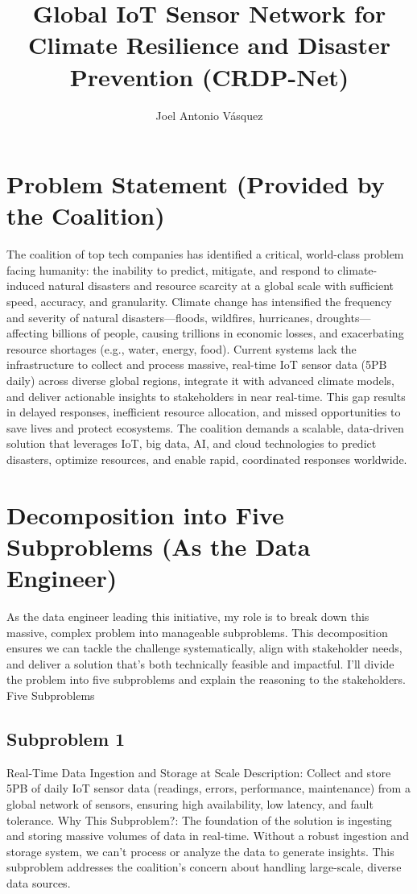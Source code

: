 \documentclass[10pt]{article}
\author{Joel Antonio Vásquez}
\title{Global IoT Sensor Network for Climate Resilience and Disaster Prevention (CRDP-Net)}
\begin{document}
\maketitle

\section{Problem Statement (Provided by the Coalition)}
The coalition of top tech companies has identified a critical, world-class problem facing humanity: the inability to predict, mitigate, and respond to climate-induced natural disasters and resource scarcity at a global scale with sufficient speed, accuracy, and granularity. Climate change has intensified the frequency and severity of natural disasters—floods, wildfires, hurricanes, droughts—affecting billions of people, causing trillions in economic losses, and exacerbating resource shortages (e.g., water, energy, food). Current systems lack the infrastructure to collect and process massive, real-time IoT sensor data (5PB daily) across diverse global regions, integrate it with advanced climate models, and deliver actionable insights to stakeholders in near real-time. This gap results in delayed responses, inefficient resource allocation, and missed opportunities to save lives and protect ecosystems. The coalition demands a scalable, data-driven solution that leverages IoT, big data, AI, and cloud technologies to predict disasters, optimize resources, and enable rapid, coordinated responses worldwide.

\section{Decomposition into Five Subproblems (As the Data Engineer)}
As the data engineer leading this initiative, my role is to break down this massive, complex problem into manageable subproblems. This decomposition ensures we can tackle the challenge systematically, align with stakeholder needs, and deliver a solution that’s both technically feasible and impactful. I’ll divide the problem into five subproblems and explain the reasoning to the stakeholders. \\
Five Subproblems \\
\subsection{Subproblem 1} Real-Time Data Ingestion and Storage at Scale
Description: Collect and store 5PB of daily IoT sensor data (readings, errors, performance, maintenance) from a global network of sensors, ensuring high availability, low latency, and fault tolerance.
Why This Subproblem?: The foundation of the solution is ingesting and storing massive volumes of data in real-time. Without a robust ingestion and storage system, we can’t process or analyze the data to generate insights. This subproblem addresses the coalition’s concern about handling large-scale, diverse data sources.
\end{document}
